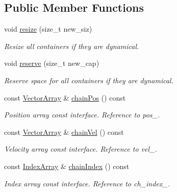 \subsection*{Public Member Functions}
\begin{DoxyCompactItemize}
\item 
void \mbox{\hyperlink{class_space_h_1_1_vel_indep_chain_particles_afdf6136619e4be707bed1e9859bc7171}{resize}} (size\+\_\+t new\+\_\+siz)
\begin{DoxyCompactList}\small\item\em Resize all containers if they are dynamical. \end{DoxyCompactList}\item 
void \mbox{\hyperlink{class_space_h_1_1_vel_indep_chain_particles_a9a6b23671b53391cded80cde58b18608}{reserve}} (size\+\_\+t new\+\_\+cap)
\begin{DoxyCompactList}\small\item\em Reserve space for all containers if they are dynamical. \end{DoxyCompactList}\item 
const \mbox{\hyperlink{class_space_h_1_1_vel_indep_particles_aa9983058940249df8b00fa800e8cbad2}{Vector\+Array}} \& \mbox{\hyperlink{class_space_h_1_1_vel_indep_chain_particles_a2dd7d2f703141d0ef3d8728b2a57cb83}{chain\+Pos}} () const
\begin{DoxyCompactList}\small\item\em Position array const interface. Reference to pos\+\_\+. \end{DoxyCompactList}\item 
const \mbox{\hyperlink{class_space_h_1_1_vel_indep_particles_aa9983058940249df8b00fa800e8cbad2}{Vector\+Array}} \& \mbox{\hyperlink{class_space_h_1_1_vel_indep_chain_particles_a741064afd96c861eac50e8de239eedaa}{chain\+Vel}} () const
\begin{DoxyCompactList}\small\item\em Velocity array const interface. Reference to vel\+\_\+. \end{DoxyCompactList}\item 
const \mbox{\hyperlink{class_space_h_1_1_vel_indep_chain_particles_a48b9183f8d68fe8af42bf405125d450c}{Index\+Array}} \& \mbox{\hyperlink{class_space_h_1_1_vel_indep_chain_particles_a4136b399758a4547ce22024318d9b654}{chain\+Index}} () const
\begin{DoxyCompactList}\small\item\em Index array const interface. Reference to ch\+\_\+index\+\_\+. \end{DoxyCompactList}\item 

\end{DoxyCompactItemize}
